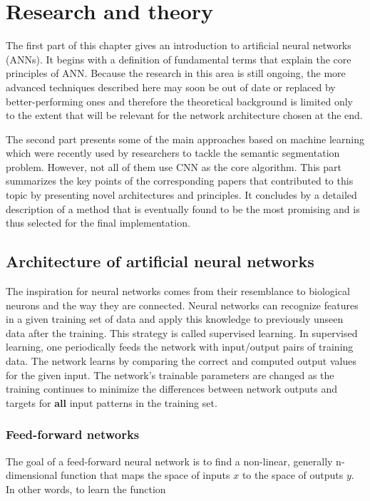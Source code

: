 \chapter{Research and theory}
\label{research}
The first part of this chapter gives an introduction to artificial neural networks (ANNs). It begins with a definition of fundamental terms that explain the core principles of ANN. Because the research in this area is still ongoing, the more advanced techniques described here may soon be out of date or replaced by better-performing ones and therefore the theoretical background is limited only to the extent that will be relevant for the network architecture chosen at the end.

The second part presents some of the main approaches based on machine learning which were recently used by researchers to tackle the semantic segmentation problem. However, not all of them use CNN as the core algorithm. This part summarizes the key points of the corresponding papers that contributed to this topic by presenting novel architectures and principles. It concludes by a detailed description of a method that is eventually found to be the most promising and is thus selected for the final implementation.

\section{Architecture of artificial neural networks}

The inspiration for neural networks comes from their resemblance to biological neurons and the way they are connected. Neural networks can recognize features in a given training set of data and apply this knowledge to previously unseen data after the training. This strategy is called supervised learning. In supervised learning, one periodically feeds the network with input/output pairs of training data. The network learns by comparing the correct and computed output values for the given input. The network's trainable parameters are changed as the training continues to minimize the differences between network outputs and targets for \textbf{all} input patterns in the training set. \cite{mehlig}

\subsection{Feed-forward networks}

The goal of a feed-forward neural network is to find a non-linear, generally n-dimensional function that maps the space of inputs $ x $ to the space of outputs $ y $. In other words, to learn the function \cite{santiago}

